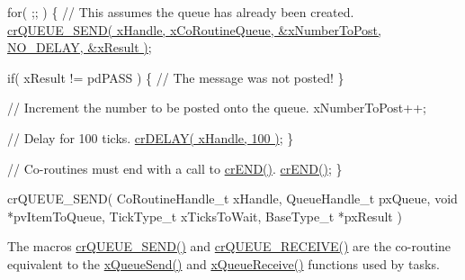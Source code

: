 \begin{DoxyPre} for( ;; )
 \{
     // This assumes the queue has already been created.
     \hyperlink{vendor_2ceedling_2plugins_2freertos_2src_2freertos_2include_2croutine_8h_a26af3d36f22a04168eebdf5b08465d6e}{crQUEUE\_SEND( xHandle, xCoRoutineQueue, &xNumberToPost, NO\_DELAY, &xResult )};\end{DoxyPre}



\begin{DoxyPre}     if( xResult != pdPASS )
     \{
         // The message was not posted!
     \}\end{DoxyPre}



\begin{DoxyPre}     // Increment the number to be posted onto the queue.
     xNumberToPost++;\end{DoxyPre}



\begin{DoxyPre}     // Delay for 100 ticks.
     \hyperlink{vendor_2ceedling_2plugins_2freertos_2src_2freertos_2include_2croutine_8h_a05a06feb11028f2d1d440ea335f562ba}{crDELAY( xHandle, 100 )};
 \}\end{DoxyPre}



\begin{DoxyPre} // Co-routines must end with a call to \hyperlink{vendor_2ceedling_2plugins_2freertos_2src_2freertos_2include_2croutine_8h_ae6038cc976689b50000475ebfc4e2f23}{crEND()}.
 \hyperlink{vendor_2ceedling_2plugins_2freertos_2src_2freertos_2include_2croutine_8h_ae6038cc976689b50000475ebfc4e2f23}{crEND()};
\}
\end{DoxyPre}



\begin{DoxyPre}
crQUEUE\_SEND(
                 CoRoutineHandle\_t xHandle,
                 QueueHandle\_t pxQueue,
                 void *pvItemToQueue,
                 TickType\_t xTicksToWait,
                 BaseType\_t *pxResult
            )\end{DoxyPre}


The macro\textquotesingle{}s \hyperlink{vendor_2ceedling_2plugins_2freertos_2src_2freertos_2include_2croutine_8h_a26af3d36f22a04168eebdf5b08465d6e}{cr\+Q\+U\+E\+U\+E\+\_\+\+S\+E\+N\+D()} and \hyperlink{vendor_2ceedling_2plugins_2freertos_2src_2freertos_2include_2croutine_8h_a586d57fd9a3e2aa5ae66484ed3be36c9}{cr\+Q\+U\+E\+U\+E\+\_\+\+R\+E\+C\+E\+I\+V\+E()} are the co-\/routine equivalent to the \hyperlink{externals_2freertos_2include_2queue_8h_af7eb49d3249351176992950d9185abe9}{x\+Queue\+Send()} and \hyperlink{vendor_2ceedling_2plugins_2freertos_2src_2freertos_2include_2queue_8h_af1549eac0e7f05694a59a0b967c80be3}{x\+Queue\+Receive()} functions used by tasks.

